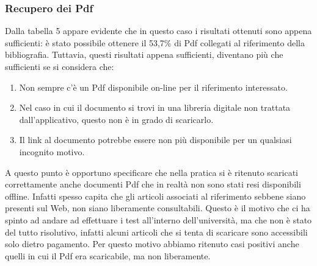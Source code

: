 \subsubsection{Recupero dei Pdf}
Dalla tabella 5 appare evidente che in questo caso i risultati ottenuti sono appena sufficienti: è stato possibile ottenere il 53,7\% di Pdf collegati al riferimento della bibliografia. Tuttavia, questi risultati appena sufficienti, diventano più che sufficienti se si considera che: 
\begin{enumerate}
 \item Non sempre c'è un Pdf disponibile on-line per il riferimento interessato.
 \item Nel caso in cui il documento si trovi in una libreria digitale non trattata dall'applicativo, questo non è in grado di scaricarlo.
 \item Il link al documento potrebbe essere non più disponibile per un qualsiasi incognito motivo.
\end{enumerate}
A questo punto è opportuno specificare che nella pratica si è ritenuto scaricati correttamente anche documenti Pdf che in realtà non sono stati resi disponibili offline. Infatti spesso capita che gli articoli associati al riferimento sebbene siano presenti sul Web, non siano liberamente consultabili. Questo è il motivo che ci ha spinto ad andare ad effettuare i test all'interno dell'università, ma che non è stato del tutto risolutivo, infatti alcuni articoli che si tenta di scaricare sono accessibili solo dietro pagamento. Per questo motivo abbiamo ritenuto casi positivi anche quelli in cui il Pdf era scaricabile, ma non liberamente.


